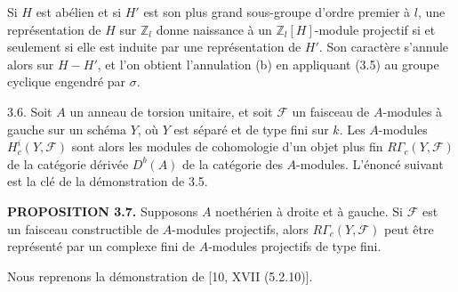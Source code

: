 \documentclass[9pt,twoside]{extarticle}
\begin{document}
{Si \(H\) est abélien et si \(H'\) est son plus grand sous-groupe d'ordre premier à \(l\), une représentation de \(H\) sur \(\mathbb Z_l\) donne naissance à un \(\mathbb Z_l[H]\)-module projectif si et seulement si elle est induite par une représentation de \(H'\). Son caractère s'annule alors sur \(H-H'\), et l'on obtient l'annulation (b) en appliquant (3.5) au groupe cyclique engendré par \(\sigma\).\par

3.6. Soit \(A\) un anneau de torsion unitaire, et soit \(\mathcal F\) un faisceau de \(A\)-modules à gauche sur un schéma \(Y\), où \(Y\) est séparé et de type fini sur \(k\). Les \(A\)-modules \(H_c^i(Y,\mathcal F)\) sont alors les modules de cohomologie d'un objet plus fin \(R\Gamma_c(Y,\mathcal F)\) de la catégorie dérivée \(D^b(A)\) de la catégorie des \(A\)-modules. L'énoncé suivant est la clé de la démonstration de 3.5.\par

\noindent\textbf{PROPOSITION 3.7.} Supposons \(A\) noethérien à droite et à gauche. Si \(\mathcal F\) est un faisceau constructible de \(A\)-modules projectifs, alors \(R\Gamma_c(Y,\mathcal F)\) peut être représenté par un complexe fini de \(A\)-modules projectifs de type fini.\par

Nous reprenons la démonstration de [10, XVII (5.2.10)].\par
}
\end{document}
